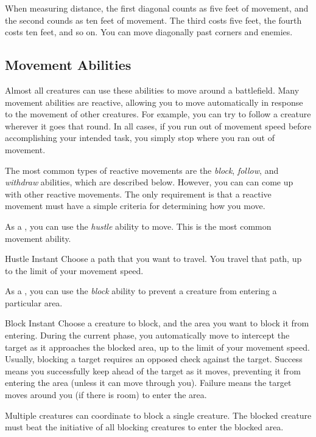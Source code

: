         \label{Diagonals} When measuring distance, the first diagonal counts as five feet of movement, and the second counds as ten feet of movement.
        The third costs five feet, the fourth costs ten feet, and so on.
        You can move diagonally past corners and enemies.

    \subsection{Movement Abilities}\label{Movement Abilities}

        Almost all creatures can use these abilities to move around a battlefield.
        Many movement abilities are reactive, allowing you to move automatically in response to the movement of other creatures.
        For example, you can try to follow a creature wherever it goes that round.
        In all cases, if you run out of movement speed before accomplishing your intended task, you simply stop where you ran out of movement.

        The most common types of reactive movements are the \textit{block}, \textit{follow}, and \textit{withdraw} abilities, which are described below.
        However, you can can come up with other reactive movements.
        The only requirement is that a reactive movement must have a simple criteria for determining how you move.

         As a , you can use the \textit{hustle} ability to move.
        This is the most common movement ability.

        \begin{instantability}{Hustle}
            \label{Hustle}
            Instant
            \rankline
            Choose a path that you want to travel. You travel that path, up to the limit of your movement speed.
        \end{instantability}

         As a , you can use the \textit{block} ability to prevent a creature from entering a particular area.

        \begin{instantability}{Block}
            \label{Block}
            Instant
            \rankline
            Choose a creature to block, and the area you want to block it from entering.
            During the current phase, you automatically move to intercept the target as it approaches the blocked area, up to the limit of your movement speed.
            Usually, blocking a target requires an opposed  check against the target.
            Success means you successfully keep ahead of the target as it moves, preventing it from entering the area (unless it can move through you).
            Failure means the target moves around you (if there is room) to enter the area.

            Multiple creatures can coordinate to block a single creature.
            The blocked creature must beat the initiative of all blocking creatures to enter the blocked area.
        \end{instantability}

